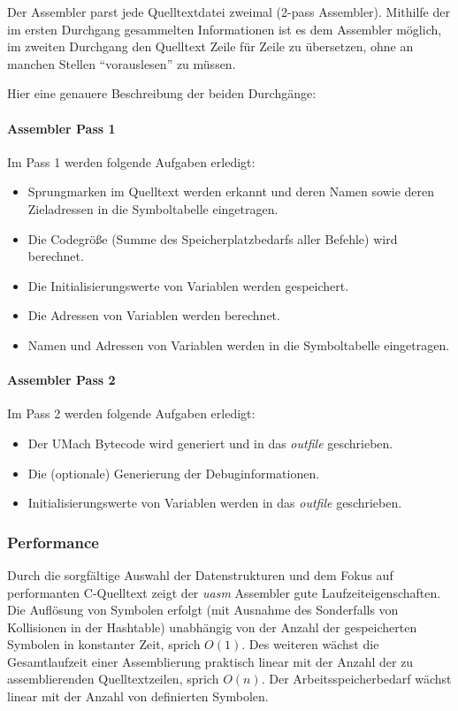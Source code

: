 Der Assembler parst jede Quelltextdatei zweimal (2-pass Assembler). Mithilfe der
im ersten Durchgang gesammelten Informationen ist es dem Assembler möglich, im
zweiten Durchgang den Quelltext Zeile für Zeile zu übersetzen, ohne an manchen
Stellen ``vorauslesen'' zu müssen.

Hier eine genauere Beschreibung der beiden Durchgänge:

\paragraph{Assembler Pass 1}

Im Pass 1 werden folgende Aufgaben erledigt:
\begin{itemize}
    \item Sprungmarken im Quelltext werden erkannt und deren Namen sowie deren
          Zieladressen in die Symboltabelle eingetragen.
    \item Die Codegröße (Summe des Speicherplatzbedarfs aller Befehle) wird
          berechnet.
    \item Die Initialisierungswerte von Variablen werden gespeichert.
    \item Die Adressen von Variablen werden berechnet.
    \item Namen und Adressen von Variablen werden in die Symboltabelle
          eingetragen.
\end{itemize}

\paragraph{Assembler Pass 2}

Im Pass 2 werden folgende Aufgaben erledigt:
\begin{itemize}
    \item Der UMach Bytecode wird generiert und in das \emph{outfile}
          geschrieben.
    \item Die (optionale) Generierung der Debuginformationen.
    \item Initialisierungswerte von Variablen werden in das \emph{outfile}
          geschrieben.
\end{itemize}

\subsubsection{Performance}

Durch die sorgfältige Auswahl der Datenstrukturen und dem Fokus auf performanten
C-Quelltext zeigt der \emph{uasm} Assembler gute Laufzeiteigenschaften.
Die Auflösung von Symbolen erfolgt (mit Ausnahme des Sonderfalls von Kollisionen
in der Hashtable) unabhängig von der Anzahl der gespeicherten Symbolen in
konstanter Zeit, sprich $O(1)$.
Des weiteren wächst die Gesamtlaufzeit einer Assemblierung praktisch linear mit
der Anzahl der zu assemblierenden Quelltextzeilen, sprich $O(n)$.
Der Arbeitsspeicherbedarf wächst linear mit der Anzahl von definierten Symbolen.

